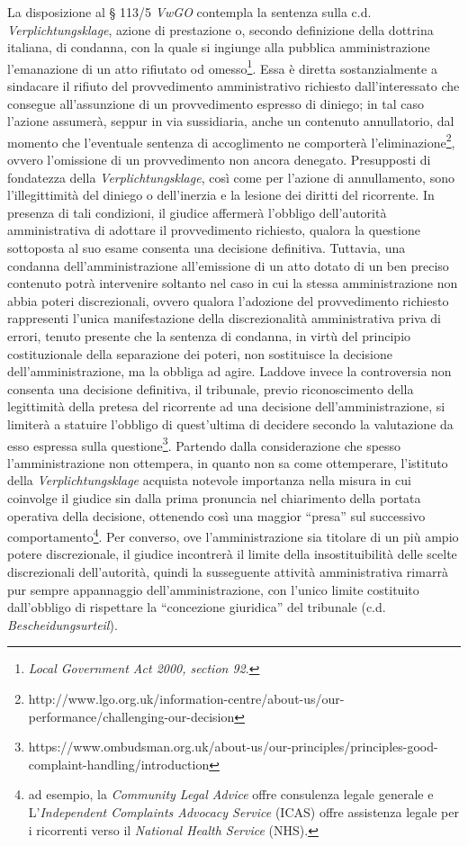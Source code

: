 \documentclass[12pt,it,a4paper,]{report}
\begin{document}
La disposizione al § 113/5 \emph{VwGO} contempla la sentenza sulla c.d.
\emph{Verplichtungsklage}, azione di prestazione o, secondo definizione
della dottrina italiana, di condanna, con la quale si ingiunge alla
pubblica amministrazione l'emanazione di un atto rifiutato od
omesso\footnote{\emph{Local Government Act 2000, section 92}.}. Essa è
diretta sostanzialmente a sindacare il rifiuto del provvedimento
amministrativo richiesto dall'interessato che consegue all'assunzione di
un provvedimento espresso di diniego; in tal caso l'azione assumerà,
seppur in via sussidiaria, anche un contenuto annullatorio, dal momento
che l'eventuale sentenza di accoglimento ne comporterà
l'eliminazione\footnote{http://www.lgo.org.uk/information-centre/about-us/our-performance/challenging-our-decision},
ovvero l'omissione di un provvedimento non ancora denegato. Presupposti
di fondatezza della \emph{Verplichtungsklage}, così come per l'azione di
annullamento, sono l'illegittimità del diniego o dell'inerzia e la
lesione dei diritti del ricorrente. In presenza di tali condizioni, il
giudice affermerà l'obbligo dell'autorità amministrativa di adottare il
provvedimento richiesto, qualora la questione sottoposta al suo esame
consenta una decisione definitiva. Tuttavia, una condanna
dell'amministrazione all'emissione di un atto dotato di un ben preciso
contenuto potrà intervenire soltanto nel caso in cui la stessa
amministrazione non abbia poteri discrezionali, ovvero qualora
l'adozione del provvedimento richiesto rappresenti l'unica
manifestazione della discrezionalità amministrativa priva di errori,
tenuto presente che la sentenza di condanna, in virtù del principio
costituzionale della separazione dei poteri, non sostituisce la
decisione dell'amministrazione, ma la obbliga ad agire. Laddove invece
la controversia non consenta una decisione definitiva, il tribunale,
previo riconoscimento della legittimità della pretesa del ricorrente ad
una decisione dell'amministrazione, si limiterà a statuire l'obbligo di
quest'ultima di decidere secondo la valutazione da esso espressa sulla
questione\footnote{https://www.ombudsman.org.uk/about-us/our-principles/principles-good-complaint-handling/introduction}.
Partendo dalla considerazione che spesso l'amministrazione non
ottempera, in quanto non sa come ottemperare, l'istituto della
\emph{Verplichtungsklage} acquista notevole importanza nella misura in
cui coinvolge il giudice sin dalla prima pronuncia nel chiarimento della
portata operativa della decisione, ottenendo così una maggior ``presa''
sul successivo comportamento\footnote{ad esempio, la \emph{Community
  Legal Advice} offre consulenza legale generale e L'\emph{Independent
  Complaints Advocacy Service} (ICAS) offre assistenza legale per i
  ricorrenti verso il \emph{National Health Service} (NHS).}. Per
converso, ove l'amministrazione sia titolare di un più ampio potere
discrezionale, il giudice incontrerà il limite della insostituibilità
delle scelte discrezionali dell'autorità, quindi la susseguente attività
amministrativa rimarrà pur sempre appannaggio dell'amministrazione, con
l'unico limite costituito dall'obbligo di rispettare la ``concezione
giuridica'' del tribunale (c.d. \emph{Bescheidungsurteil}).
\end{document}
